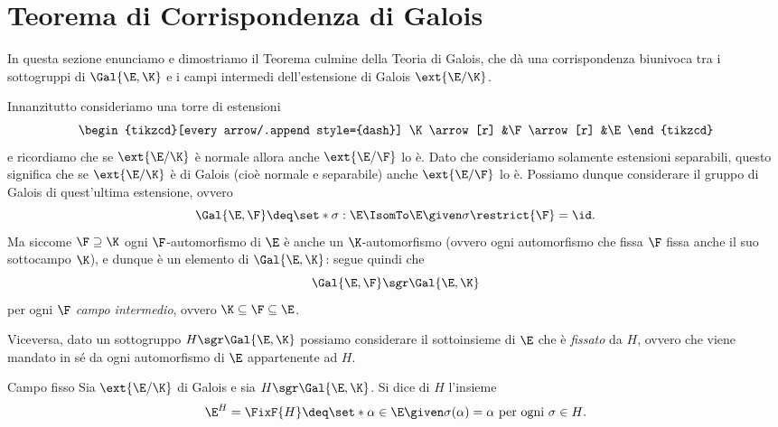 \section{Teorema di Corrispondenza di Galois}

In questa sezione enunciamo e dimostriamo il Teorema culmine della Teoria di Galois, che dà una corrispondenza biunivoca tra i sottogruppi di $\Gal{\E , \K}$ e i campi intermedi dell'estensione di Galois $\ext{\E / \K}$.

Innanzitutto consideriamo una torre di estensioni \[
    \begin{tikzcd}[every arrow/.append style={dash}]
        \K \arrow[r] &\F \arrow[r] &\E
    \end{tikzcd}
\] e ricordiamo che se $\ext{\E / \K}$ è normale allora anche $\ext{\E / \F}$ lo è. Dato che consideriamo solamente estensioni separabili, questo significa che se $\ext{\E / \K}$ è di Galois (cioè normale e separabile) anche $\ext{\E / \F}$ lo è. Possiamo dunque considerare il gruppo di Galois di quest'ultima estensione, ovvero \[
    \Gal{\E, \F} \deq \set*{\sigma : \E \IsomTo \E \given \sigma\restrict{\F} = \id}.
\] Ma siccome $\F \supseteq \K$ ogni $\F$-automorfismo di $\E$ è anche un $\K$-automorfismo (ovvero ogni automorfismo che fissa $\F$ fissa anche il suo sottocampo $\K$), e dunque è un elemento di $\Gal{\E, \K}$: segue quindi che \[
    \Gal{\E, \F} \sgr \Gal{\E, \K}
\] per ogni $\F$ \emph{campo intermedio}, ovvero $\K \subseteq \F \subseteq \E$. 

Viceversa, dato un sottogruppo $H \sgr \Gal{\E, \K}$ possiamo considerare il sottoinsieme di $\E$ che è \emph{fissato} da $H$, ovvero che viene mandato in sé da ogni automorfismo di $\E$ appartenente ad $H$.

\begin{definition}
    {Campo fisso}{}
    Sia $\ext{\E / \K}$ di Galois e sia $H \sgr \Gal{\E, \K}$. Si dice  di $H$ l'insieme \[
        \E^H = \FixF{H} \deq \set*{\alpha \in \E \given \sigma(\alpha) = \alpha \text{ per ogni } \sigma \in H}.
    \]
\end{definition}

